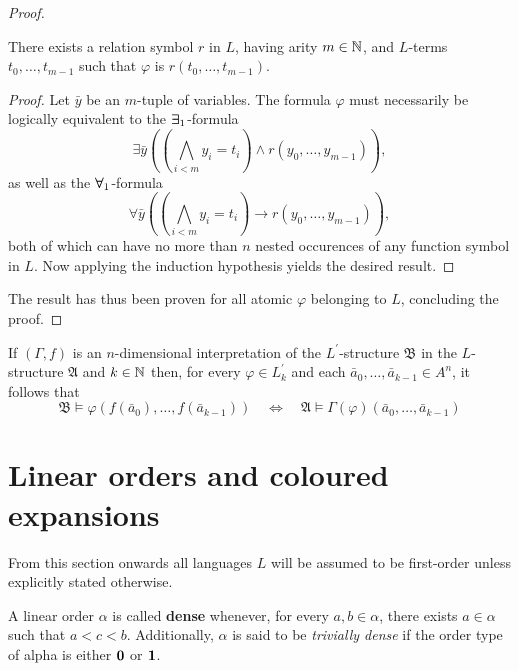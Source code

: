 \begin{proof}
	\begin{case}
		There exists a relation symbol $r$ in $L$, having arity $m\in\mathbb{N}$, and $L$-terms $t_0,\dotsc,t_{m-1}$ such that $\varphi$ is $r(t_0,\dotsc,t_{m-1})$.
	\end{case}
	\begin{proof}
		Let $\bar{y}$ be an $m$-tuple of variables.  The formula $\varphi$ must necessarily be logically equivalent to the $\bm{\exists}_{1}$-formula
		\begin{equation}
			\exists\bar{y}\left(\left(\bigwedge_{i<m}y_i=t_i\right)\wedge r(y_0,\dotsc,y_{m-1})\right),
		\end{equation}
		as well as the $\bm{\forall}_{1}$-formula
		\begin{equation}
			\forall\bar{y}\left(\left(\bigwedge_{i<m}y_i=t_i\right)\rightarrow r(y_0,\dotsc,y_{m-1})\right),
		\end{equation}
		both of which can have no more than $n$ nested occurences of any function symbol in $L$.  Now applying the induction hypothesis yields the desired result.
	\end{proof}
	The result has thus been proven for all atomic $\varphi$ belonging to $L$, concluding the proof.
\end{proof}

\begin{prp}
	If $(\Gamma,f)$ is an $n$-dimensional interpretation of the $L^\prime$-structure $\mathfrak{B}$ in the $L$-structure $\mathfrak{A}$ and $k\in\mathbb{N}$ then, for every $\varphi\in L^\prime_k$ and each $\bar{a}_0,\dotsc,\bar{a}_{k-1}\in A^n$, it follows that
	\begin{equation}
		\mathfrak{B}\models\varphi(f(\bar{a}_0),\dotsc,f(\bar{a}_{k-1}))\quad\iff\quad\mathfrak{A}\models\Gamma(\varphi)(\bar{a}_0,\dotsc,\bar{a}_{k-1})
	\end{equation}
\end{prp}

\section{Linear orders and coloured expansions}

\begin{assn}
	From this section onwards all languages $L$ will be assumed to be first-order unless explicitly stated otherwise.
\end{assn}

\begin{dfn}
	A linear order $\alpha$ is called \textbf{dense} whenever, for every $a,b\in\alpha$, there exists $a\in\alpha$ such that $a<c<b$.  Additionally, $\alpha$ is said to be \textit{trivially dense} if the order type of alpha is either $\mathbf{0}$ or $\mathbf{1}$.
\end{dfn}

